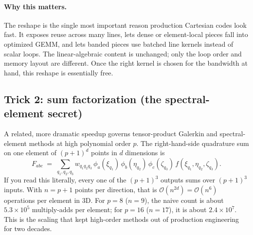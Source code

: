 \documentclass[11pt]{article}
\newcommand{\bigO}{\mathcal{O}}
\begin{document}
\paragraph{Why this matters.}
The reshape is the single most important reason production Cartesian
codes look fast.  It exposes reuse across many lines, lets dense or
element-local pieces fall into optimized GEMM, and lets banded pieces
use batched line kernels instead of scalar loops.  The
linear-algebraic content is unchanged; only the loop order and memory
layout are different.  Once the right kernel is chosen for the
bandwidth at hand, this reshape is essentially free.

\subsection{Trick 2: sum factorization (the spectral-element secret)}
\label{sec:sumfac}

A related, more dramatic speedup governs tensor-product Galerkin and
spectral-element methods at high polynomial order $p$.  The
right-hand-side quadrature sum on one element of $(p+1)^d$ points
in $d$ dimensions is
\begin{equation}
  F_{abc} \;=\; \sum_{q_1, q_2, q_3} w_{q_1 q_2 q_3}\,
  \phi_a(\xi_{q_1})\, \phi_b(\eta_{q_2})\, \phi_c(\zeta_{q_3})\,
  f(\xi_{q_1}, \eta_{q_2}, \zeta_{q_3}).
\end{equation}
If you read this literally, every one of the $(p+1)^3$ outputs sums
over $(p+1)^3$ inputs.  With $n=p+1$ points per direction, that is
$\bigO(n^{2d}) = \bigO(n^{6})$ operations per element in 3D.  For
$p=8$ ($n=9$), the naive count is about $5.3\times10^5$ multiply-adds
per element; for $p=16$ ($n=17$), it is about $2.4\times10^7$.  This
is the scaling that kept high-order methods out of production
engineering for two decades.
\end{document}
